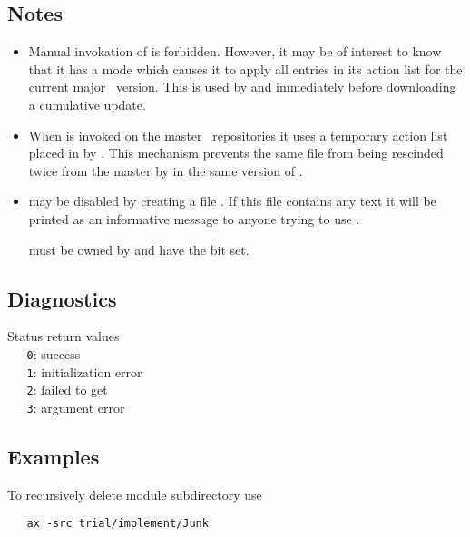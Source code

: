 \subsection*{Notes}

\begin{itemize}
\item
   Manual invokation of  is forbidden.  However, it may be of
   interest to know that it has a mode which causes it to apply all entries in
   its action list for the current major \aipspp\ version.  This is used by
    and  immediately before downloading a
   cumulative update.

\item
   When  is invoked on the master \rcs\ repositories it uses a
   temporary action list placed in  by .
   This mechanism prevents the same file from being rescinded twice from the
   master by  in the same version of \aipspp.

\item
    may be disabled by creating a file .
   If this file contains any text it will be printed as an informative message
   to anyone trying to use .

    must be owned by  and have the  bit
   set.
\end{itemize}

\subsection*{Diagnostics}

Status return values
\\ \verb+   0+: success
\\ \verb+   1+: initialization error
\\ \verb+   2+: failed to get 
\\ \verb+   3+: argument error

\subsection*{Examples}

To recursively delete module subdirectory  use
 
\begin{verbatim}
   ax -src trial/implement/Junk
\end{verbatim}
 
